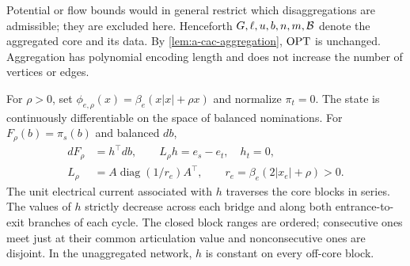 Potential or flow bounds would in general restrict which disaggregations
are admissible; they are excluded here. Henceforth $G,\ell,u,b,n,m,\mathcal{B}$
denote the aggregated core and its data. By \cref{lem:a-cac-aggregation},
$\mathrm{OPT}$ is unchanged. Aggregation has polynomial encoding length and
does not increase the number of vertices or edges.

\begin{lemma}
\label{lem:a-cac-adjoint}
For $\rho>0$, set
$\phi_{e,\rho}(x)=\beta_e(x|x|+\rho x)$ and normalize $\pi_t=0$.
The state is continuously differentiable on the space of balanced
nominations. For $F_\rho(b)=\pi_s(b)$ and balanced $db$,
\begin{equation}
 \begin{aligned}
 dF_\rho&=h^\top db,\qquad L_\rho h=e_s-e_t,\quad h_t=0,\\
 L_\rho&=A\operatorname{diag}(1/r_e)A^\top,\qquad
 r_e=\beta_e(2|x_e|+\rho)>0.
 \end{aligned}
 \label{eq:a-cac-adjoint}
\end{equation}
The unit electrical current associated with $h$ traverses the core
blocks in series. The values of $h$ strictly decrease across each
bridge and along both entrance-to-exit branches of each cycle.
The closed block ranges are ordered; consecutive ones meet just at
their common articulation value and nonconsecutive ones are disjoint.
In the unaggregated network, $h$ is constant on every off-core block.
\end{lemma}
